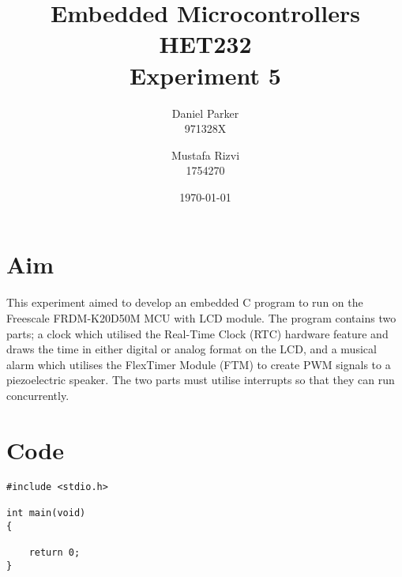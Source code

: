\documentclass{article}
\title{Embedded Microcontrollers HET232 \\ Experiment 5}
\author{Daniel Parker \\ 971328X \and Mustafa Rizvi \\ 1754270}
\date{\today}
\begin{document}
\maketitle
\section{Aim}
This experiment aimed to develop an embedded C program to run on the Freescale FRDM-K20D50M MCU with LCD module. The program contains two parts; a clock which utilised the Real-Time Clock (RTC) hardware feature and draws the time in either digital or analog format on the LCD, and a musical alarm which utilises the FlexTimer Module (FTM) to create PWM signals to a piezoelectric speaker. The two parts must utilise interrupts so that they can run concurrently.
\maketitle
\section{Code}
\begin{lstlisting}
#include <stdio.h>

int main(void)
{

	return 0;
}
\end{lstlisting}
\end{document}
